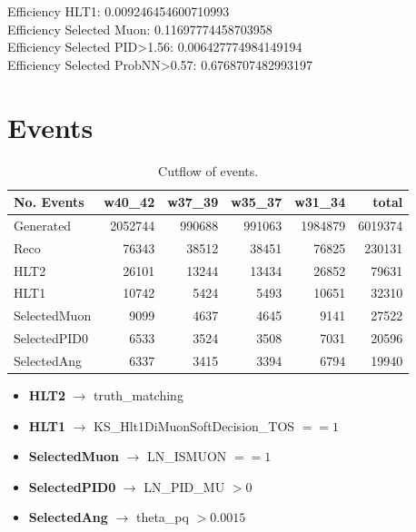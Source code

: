 \documentclass[12pt,a4paper]{article}
\begin{document}
Efficiency HLT1: 0.009246454600710993\\
Efficiency Selected Muon: 0.11697774458703958\\
Efficiency Selected PID>1.56: 0.006427774984149194\\
Efficiency Selected ProbNN>0.57: 0.6768707482993197

\newpage
\section{Events}
\begin{table}[h]
\centering
\begin{tabular}{lrrrrr}
\hline
 No. Events    &   w40\_42 &   w37\_39 &   w35\_37 &   w31\_34  & total \\
\hline
 Generated     &   2052744 &    990688 &    991063 &   1984879  & 6019374\\
 Reco          &     76343 &     38512 &     38451 &     76825  & 230131\\
 HLT2          &     26101 &     13244 &     13434 &     26852  & 79631\\
 HLT1          &     10742 &      5424 &      5493 &     10651  & 32310\\
 SelectedMuon  &      9099 &      4637 &      4645 &      9141  & 27522\\
 SelectedPID0  &      6533 &      3524 &      3508 &      7031  & 20596\\
 SelectedAng   &      6337 &      3415 &      3394 &      6794  & 19940\\
\hline
\end{tabular}
\caption{Cutflow of events.}
\end{table}
\begin{itemize}
    \item \textbf{HLT2} $\to$ truth\_matching
    \item \textbf{HLT1} $\to$ KS\_Hlt1DiMuonSoftDecision\_TOS $== 1$
    \item \textbf{SelectedMuon} $\to$ LN\_ISMUON $== 1$
    \item \textbf{SelectedPID0} $\to$ LN\_PID\_MU $> 0$
    \item \textbf{SelectedAng} $\to$ theta\_pq $> 0.0015$
\end{itemize}
\newpage
\end{document}
